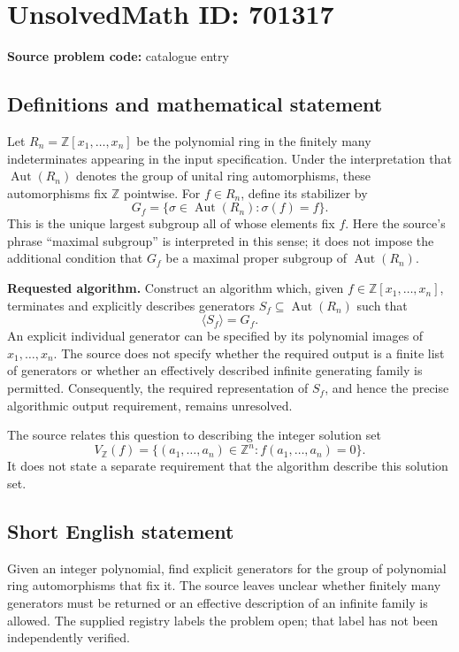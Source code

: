 \documentclass[11pt]{article}
\newcommand{\Z}{\mathbb{Z}}
\begin{document}
\section*{UnsolvedMath ID: 701317}
\textbf{Source problem code:} catalogue entry
\subsection{Definitions and mathematical statement}
Let \(R_n=\Z[x_1,\ldots,x_n]\) be the polynomial ring in the finitely many indeterminates appearing in the input specification. Under the interpretation that \(\operatorname{Aut}(R_n)\) denotes the group of unital ring automorphisms, these automorphisms fix \(\Z\) pointwise. For \(f\in R_n\), define its stabilizer by
\[
G_f=\{\sigma\in\operatorname{Aut}(R_n):\sigma(f)=f\}.
\]
This is the unique largest subgroup all of whose elements fix \(f\). Here the source's phrase ``maximal subgroup'' is interpreted in this sense; it does not impose the additional condition that \(G_f\) be a maximal proper subgroup of \(\operatorname{Aut}(R_n)\).

\textbf{Requested algorithm.} Construct an algorithm which, given \(f\in\Z[x_1,\ldots,x_n]\), terminates and explicitly describes generators \(S_f\subseteq\operatorname{Aut}(R_n)\) such that
\[
\langle S_f\rangle=G_f.
\]
An explicit individual generator can be specified by its polynomial images of \(x_1,\ldots,x_n\). The source does not specify whether the required output is a finite list of generators or whether an effectively described infinite generating family is permitted. Consequently, the required representation of \(S_f\), and hence the precise algorithmic output requirement, remains unresolved.

The source relates this question to describing the integer solution set
\[
V_{\Z}(f)=\{(a_1,\ldots,a_n)\in\Z^n:f(a_1,\ldots,a_n)=0\}.
\]
It does not state a separate requirement that the algorithm describe this solution set.
\subsection{Short English statement}
Given an integer polynomial, find explicit generators for the group of polynomial ring automorphisms that fix it. The source leaves unclear whether finitely many generators must be returned or an effective description of an infinite family is allowed. The supplied registry labels the problem open; that label has not been independently verified.
\end{document}

